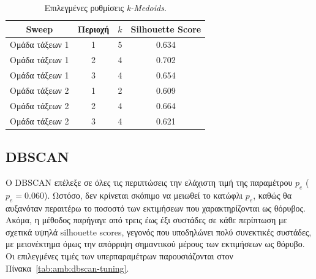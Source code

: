 \begin{table}[htbp]
    \centering
    \caption{Επιλεγμένες ρυθμίσεις \textenglish{\textit{k-Medoids}}.}
    \label{tab:amb:kmedoids-tuning}
    \begin{tabular}{cccc}
        \toprule
        Sweep & Περιοχή & $k$ & Silhouette Score \\
        \midrule
        Ομάδα τάξεων 1 & 1 & 5 & 0.634 \\
        Ομάδα τάξεων 1 & 2 & 4 & 0.702 \\
        Ομάδα τάξεων 1 & 3 & 4 & 0.654 \\
        Ομάδα τάξεων 2 & 1 & 2 & 0.609 \\
        Ομάδα τάξεων 2 & 2 & 4 & 0.664 \\
        Ομάδα τάξεων 2 & 3 & 4 & 0.621 \\
        \bottomrule
    \end{tabular}
\end{table}

\subsection{DBSCAN}

Ο DBSCAN επέλεξε σε όλες τις περιπτώσεις την ελάχιστη τιμή της παραμέτρου $p_e$ ($p_e = 0.060$). Ωστόσο, δεν κρίνεται σκόπιμο να μειωθεί το κατώφλι $p_e$, καθώς θα αυξανόταν περαιτέρω το ποσοστό των εκτιμήσεων που χαρακτηρίζονται ως θόρυβος. Ακόμα, η μέθοδος παρήγαγε από τρεις έως έξι συστάδες σε κάθε περίπτωση με σχετικά υψηλά silhouette scores, γεγονός που υποδηλώνει πολύ συνεκτικές συστάδες, με μειονέκτημα όμως την απόρριψη σημαντικού μέρους των εκτιμήσεων ως θόρυβο. Οι επιλεγμένες τιμές των υπερπαραμέτρων παρουσιάζονται στον Πίνακα~\ref{tab:amb:dbscan-tuning}.

\begin{table}[htbp]
    \centering
    \caption{Επιλεγμένες ρυθμίσεις DBSCAN.}
    \label{tab:amb:dbscan-tuning}
\end{table}


